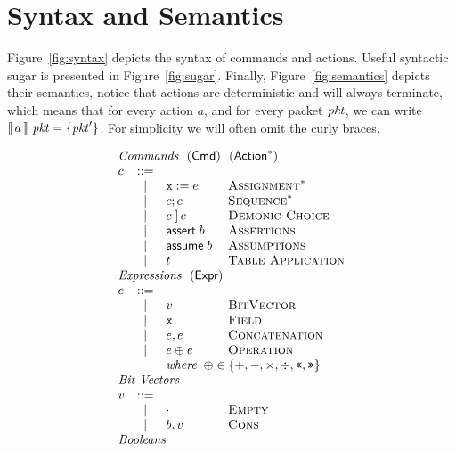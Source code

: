 \section{Syntax and Semantics}

Figure~\ref{fig:syntax} depicts the syntax of commands and
actions. Useful syntactic sugar is presented in
Figure~\ref{fig:sugar}. Finally, Figure~\ref{fig:semantics} depicts
their semantics, notice that actions are deterministic and will always
terminate, which means that for every action $a$, and for every packet
$\mathit{pkt}$, we can write $\llbracket\,a\,\rrbracket~\mathit{pkt} = \{\mathit{pkt}'\}$. For simplicity we
will often omit the curly braces.


\begin{figure}[ht]
  \[\begin{array}{l c l l}
      \multicolumn{4}{l}{\textit{Commands}~~(\Cmd)~~(\Action^*)}\\
      c & ::=& \\
        & \mid & \var x := e & \textsc{Assignment}^*\\
        & \mid & c;c & \textsc{Sequence}^* \\
        & \mid & c \angel c & \textsc{Demonic Choice}\\
        & \mid & \assert b & \textsc{Assertions} \\
        & \mid & \assume b & \textsc{Assumptions} \\
        & \mid & t & \textsc{Table Application}\\
      \multicolumn{4}{l}{\textit{Expressions}~~(\Expr)} \\
      e & ::= & \\
        & \mid & v            & \textsc{BitVector} \\
        & \mid & \var x       & \textsc{Field} \\
        & \mid & e,e          & \textsc{Concatenation} \\
        & \mid & e \oplus e   & \textsc{Operation} \\
        & &  \multicolumn{2}{l}{\textit{where}\;\; \oplus \in \{+,-,\times, \div, \texttt{<<}, \texttt{>>} \}} \\
      \multicolumn{4}{l}{\textit{Bit Vectors}}\\
      v & ::= & \\
        & \mid & \cdot & \textsc{Empty} \\
        & \mid & b,v   & \textsc{Cons} \\
      \multicolumn{4}{l}{\textit{Booleans}}\\

\end{array}\]
\end{figure}
